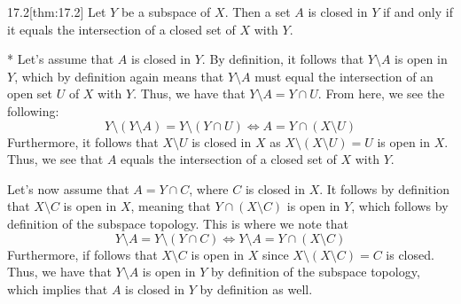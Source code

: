 \begin{thmBox}{17.2}[thm:17.2]
    Let \( Y \) be a subspace of \( X \). Then a set \( A \) is closed in 
    \( Y \) if and only if it equals the intersection of a closed set of 
    \( X \) with \( Y \).

    \baseRule

    \begin{proofBox}*
        \wrapBox{\( \implies \)}
        Let's assume that \( A \) is closed in \( Y \). 
        By definition, it follows that \( Y \setminus A \) is open in \( Y \),
        which by definition again means that \( Y \setminus A \) must equal 
        the intersection of an open set \( U \) of \( X \) with \( Y \).
        Thus, we have that \( Y \setminus A = Y \cap U \). 
        From here, we see the following:
        \begin{equation*}
            Y \setminus ( Y \setminus A ) = Y \setminus ( Y \cap U )
            \iff 
            A = Y \cap ( X \setminus U )
        \end{equation*}
        Furthermore, it follows that \( X \setminus U \) is closed in \( X \) 
        as \( X \setminus ( X \setminus U ) = U \) is open in \( X \).
        Thus, we see that \( A \) equals the intersection of a closed set of 
        \( X \) with \( Y \).

        \baseSkip

        \wrapBox{\( \impliedby \)}
        Let's now assume that \( A = Y \cap C \), where \( C \) is closed in 
        \( X \).
        It follows by definition that \( X \setminus C \) is open in \( X \),
        meaning that \( Y \cap ( X \setminus C ) \) is open in \( Y \), which 
        follows by definition of the subspace topology.
        This is where we note that 
        \begin{equation*}
            Y \setminus A
            =
            Y \setminus ( Y \cap C )
            \iff 
            Y \setminus A
            =
            Y \cap ( X \setminus C )
        \end{equation*}
        Furthermore, if follows that \( X \setminus C \) is open in \( X \) 
        since \( X \setminus ( X \setminus C ) = C \) is closed.
        Thus, we have that \( Y \setminus A \) is open in \( Y \) by definition
        of the subspace topology, which implies that \( A \) is closed in 
        \( Y \) by definition as well.
    \end{proofBox}
\end{thmBox}

